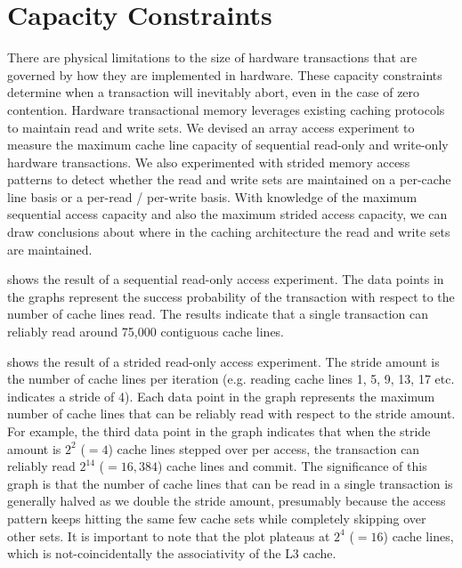 \section{Capacity Constraints}
\label{sec:capacity}
There are physical limitations to the size of hardware 
transactions that are
governed by how they are implemented in hardware. 
These capacity constraints
determine when a transaction will inevitably abort, 
even in the case of zero contention. 
Hardware transactional memory leverages existing caching 
protocols to maintain read and write sets. We 
devised an array access
experiment to measure the maximum cache line capacity 
of sequential read-only and write-only
hardware transactions. We also experimented with strided 
memory access patterns
to detect whether the read and write sets are maintained
on a per-cache line basis or a per-read / per-write basis.
With knowledge of the maximum sequential access 
capacity and also the maximum
strided access capacity, we can draw conclusions 
about where in the caching
architecture the read and write sets are 
maintained. 


 shows the result of a sequential
read-only access experiment. The data points in the graphs represent the success
probability of the transaction with respect to the number of cache lines read.
The results indicate that a single transaction can reliably read 
around 75,000 contiguous cache lines.

 shows the result of a strided read-only
access experiment. The stride amount is the number of cache lines per
iteration (e.g. reading cache lines 1, 5, 9, 13, 17 etc. 
indicates a stride of 4). Each data point in the graph 
represents the maximum number of cache
lines that can be reliably read with respect 
to the stride amount. For example,
the third data point in the graph indicates 
that when the stride amount is
$2^2$ ($=4$) cache lines stepped over per access, 
the transaction can reliably read
$2^{14}$ ($=16,384$) cache lines and commit. 
The significance of this graph is that
the number of cache lines that can be read in a 
single transaction is generally
halved as we double the stride amount, presumably 
because the access pattern
keeps hitting the same few cache sets while 
completely skipping over other sets.
It is important to note that the plot plateaus 
at $2^4$ ($=16$) cache lines, which is not-coincidentally
the associativity of the {L3} cache.


